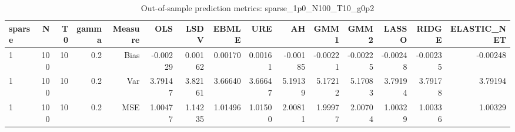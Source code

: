 \begin{table}[!htbp]\centering
\caption{Out-of-sample prediction metrics: sparse_1p0_N100_T10_g0p2}
\label{tab:table3_sparse_1p0_N100_T10_g0p2}
\begin{tabular}{lrrrrrrrrrrrrrr}
\hline
sparse & N & T0 & gamma & Measure & OLS & LSDV & EBMLE & URE & AH & GMM1 & GMM2 & LASSO & RIDGE & ELASTIC_NET \\
\hline
1 & 100 & 10 & 0.2 & Bias & -0.00229 & 0.00162 & 0.00170 & 0.00161 & -0.00185 & -0.00221 & -0.00225 & -0.00248 & -0.00235 & -0.00248 \\
1 & 100 & 10 & 0.2 & Var & 3.79147 & 3.82161 & 3.66640 & 3.66647 & 5.19139 & 5.17212 & 5.17083 & 3.79194 & 3.79178 & 3.79194 \\
1 & 100 & 10 & 0.2 & MSE & 1.00477 & 1.14235 & 1.01496 & 1.01500 & 2.00811 & 1.99977 & 2.00704 & 1.00329 & 1.00336 & 1.00329 \\
\hline
\end{tabular}
\end{table}

